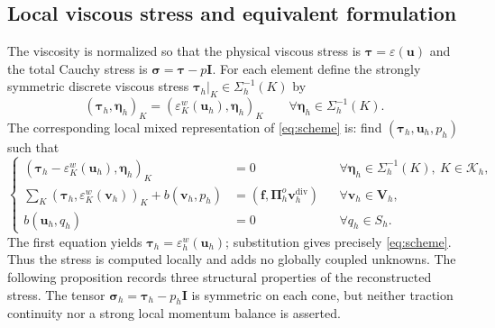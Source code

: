 \documentclass[review,hidelinks,onefignum,onetabnum]{siamart251216}
\begin{document}
\subsection{Local viscous stress and equivalent formulation}
The viscosity is normalized so that the physical viscous stress is
$\boldsymbol\tau=\varepsilon(\boldsymbol u)$ and the total Cauchy stress is
$\boldsymbol\sigma=\boldsymbol\tau-p\boldsymbol I$.
For each element define the strongly symmetric discrete viscous stress
$\boldsymbol\tau_h|_K\in\Sigma_h^{-1}(K)$ by
\begin{equation}\label{eq:stress-local}
(\boldsymbol\tau_h,\boldsymbol\eta_h)_K
=(\varepsilon_K^w(\boldsymbol u_h),\boldsymbol\eta_h)_K
\qquad\forall\boldsymbol\eta_h\in\Sigma_h^{-1}(K).
\end{equation}
The corresponding local mixed representation of
\eqref{eq:scheme} is: find
$(\boldsymbol\tau_h,\boldsymbol u_h,p_h)$ such that
\begin{equation}\label{eq:stress-mixed}
\left\{\begin{aligned}
(\boldsymbol\tau_h-\varepsilon_K^w(\boldsymbol u_h),\boldsymbol\eta_h)_K&=0
&&\forall\boldsymbol\eta_h\in\Sigma_h^{-1}(K),\ K\in\mathcal K_h,\\
\sum_K(\boldsymbol\tau_h,\varepsilon_K^w(\boldsymbol v_h))_K
+b(\boldsymbol v_h,p_h)&=(\boldsymbol f,\boldsymbol\Pi_h^o\boldsymbol v_h^{\operatorname{div}})
&&\forall\boldsymbol v_h\in\boldsymbol V_h,\\
b(\boldsymbol u_h,q_h)&=0&&\forall q_h\in S_h.
\end{aligned}\right.
\end{equation}
The first equation yields
$\boldsymbol\tau_h=\varepsilon_h^w(\boldsymbol u_h)$;
substitution gives precisely \eqref{eq:scheme}. Thus the stress is
computed locally and adds no globally coupled unknowns.
The following proposition records three structural properties of the
reconstructed stress. The tensor
$\boldsymbol\sigma_h=\boldsymbol\tau_h-p_h\boldsymbol I$ is symmetric
on each cone, but neither traction continuity nor a strong local
momentum balance is asserted.
\end{document}
